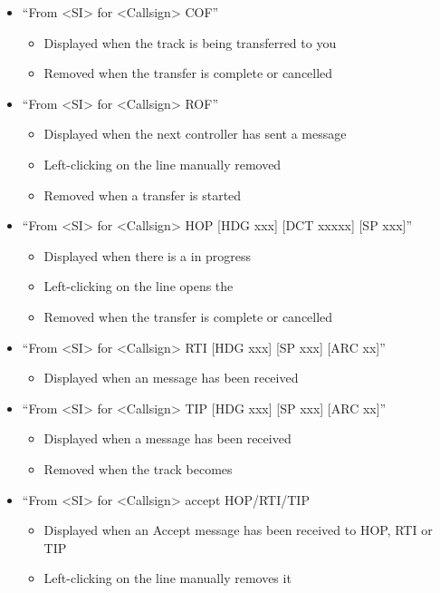 \documentclass[a4paper,oneside,11pt]{memoir}
\begin{document}
\begin{itemize} 
  \item “From <SI> for <Callsign> COF”
    \begin{itemize} 
      \item Displayed when the track is being transferred to you
      \item Removed when the transfer is complete or cancelled
    \end{itemize}
  \item “From <SI> for <Callsign> ROF”
    \begin{itemize}
      \item Displayed when the next controller has sent a  message
      \item Left-clicking on the line manually removed
      \item Removed when a transfer is started
    \end{itemize} 
  \item “From <SI> for <Callsign> HOP [HDG xxx] [DCT xxxxx] [SP xxx]”
    \begin{itemize}
      \item Displayed when there is a  in progress
      \item Left-clicking on the line opens the 
      \item Removed when the transfer is complete or cancelled
    \end{itemize} 
  \item “From <SI> for <Callsign> RTI [HDG xxx] [SP xxx] [ARC xx]”
    \begin{itemize}
      \item Displayed when an  message has been received
    \end{itemize} 
  \item “From <SI> for <Callsign> TIP [HDG xxx] [SP xxx] [ARC xx]”
    \begin{itemize}
      \item Displayed when a  message has been received
      \item Removed when the track becomes 
    \end{itemize} 
  \item “From <SI> for <Callsign> accept HOP/RTI/TIP
    \begin{itemize}
      \item Displayed when an Accept message has been received to HOP, RTI or TIP
      \item Left-clicking on the line manually removes it

\end{itemize}
\end{itemize}
\end{document}

